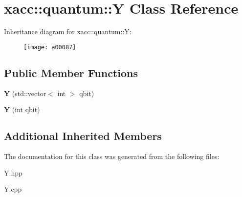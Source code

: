 \hypertarget{a00087}{}\section{xacc\+:\+:quantum\+:\+:Y Class Reference}
\label{a00087}
Inheritance diagram for xacc\+:\+:quantum\+:\+:Y\+:\begin{figure}[H]
\begin{center}
\leavevmode
\texttt{[image: a00087]}
\end{center}
\end{figure}
\subsection*{Public Member Functions}
\begin{DoxyCompactItemize}
\item 
{\bfseries Y} (std\+::vector$<$ int $>$ qbit)\hypertarget{a00087_a7959be0aa8221c0b1ba445771f5ecf0a}{}\label{a00087_a7959be0aa8221c0b1ba445771f5ecf0a}

\item 
{\bfseries Y} (int qbit)\hypertarget{a00087_aea2b37ac45208cbf6a47e0074e4a9653}{}\label{a00087_aea2b37ac45208cbf6a47e0074e4a9653}

\end{DoxyCompactItemize}
\subsection*{Additional Inherited Members}


The documentation for this class was generated from the following files\+:\begin{DoxyCompactItemize}
\item 
Y.\+hpp\item 
Y.\+cpp\end{DoxyCompactItemize}
